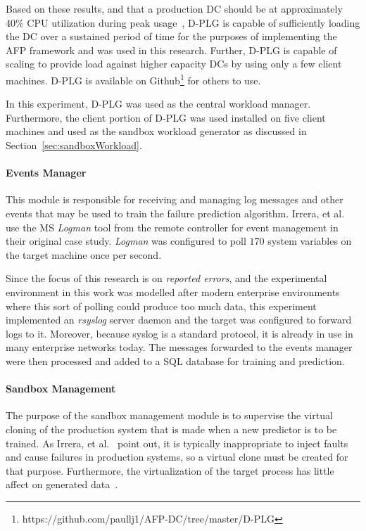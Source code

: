 Based on these results, and that a production \ac{DC} should be at
approximately 40\% \ac{CPU} utilization during peak usage~\cite{mak12},
\ac{D-PLG} is capable of sufficiently loading the \ac{DC} over a sustained
period of time for the purposes of implementing the \ac{AFP} framework and was
used in this research.  Further, \ac{D-PLG} is capable of scaling to provide
load against higher capacity \ac{DC}s by using only a few client machines.
\ac{D-PLG} is available on
Github\footnote{https://github.com/paullj1/AFP-DC/tree/master/D-PLG} for others
to use.

In this experiment, \ac{D-PLG} was used as the central workload manager.
Furthermore, the client portion of \ac{D-PLG} was used installed on five client
machines and used as the sandbox workload generator as discussed in
Section~\ref{sec:sandboxWorkload}.

\paragraph{Events Manager} \label{sec:eventsManagerMgr}
This module is responsible for receiving and managing log messages and other
events that may be used to train the failure prediction algorithm.  Irrera, et
al.~\cite{irrera2015} use the \ac{MS} \emph{Logman} tool from the remote
controller for event management in their original case study.  \emph{Logman}
was configured to poll $170$ system variables on the target machine once per
second.  

Since the focus of this research is on \emph{reported errors}, and the
experimental environment in this work was modelled after modern enterprise
environments where this sort of polling could produce too much data, this
experiment implemented an \emph{rsyslog} server daemon and the target was
configured to forward logs to it.  Moreover, because syslog is a standard
protocol, it is already in use in many enterprise networks today.  The messages
forwarded to the events manager were then processed and added to a \ac{SQL}
database for training and prediction.  

\paragraph{Sandbox Management} \label{sec:sandboxMgr} 
The purpose of the sandbox management module is to supervise the virtual
cloning of the production system that is made when a new predictor is to be
trained.  As Irrera, et al.~\cite{irrera2013,irrera2015} point out, it is
typically inappropriate to inject faults and cause failures in production
systems, so a virtual clone must be created for that purpose.  Furthermore, the
virtualization of the target process has little affect on generated
data~\cite{irrera2013}.

